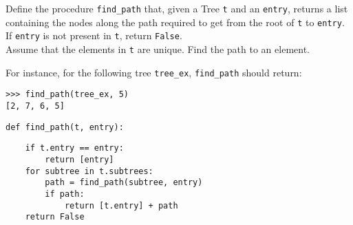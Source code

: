 \question Define the procedure \texttt{find\_path} that, given a Tree \texttt{t} and
an \texttt{entry}, returns a list containing the nodes along the path
required to get from the root of \texttt{t} to \texttt{entry}. If \texttt{entry} is not
present in \texttt{t}, return \texttt{False}.\\
Assume that the elements in \texttt{t} are unique. Find the path to an
element.

For instance, for the following tree \texttt{tree\_ex}, \texttt{find\_path} should return:
\begin{center}
\end{center}

\begin{lstlisting}
>>> find_path(tree_ex, 5)
[2, 7, 6, 5]
\end{lstlisting}

\begin{lstlisting}
def find_path(t, entry):
\end{lstlisting}
\begin{solution}[2.5in]
\begin{lstlisting}
    if t.entry == entry:
        return [entry]
    for subtree in t.subtrees:
        path = find_path(subtree, entry)
        if path:
            return [t.entry] + path
    return False
\end{lstlisting}
\end{solution}
